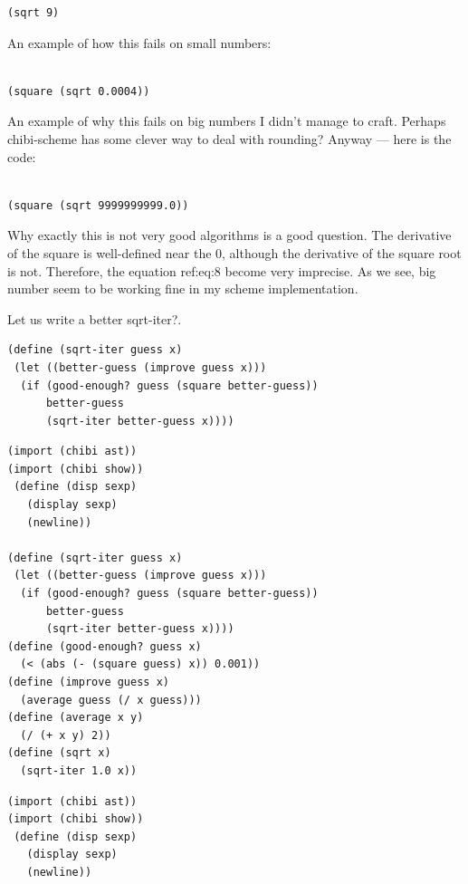 \documentclass[11pt]{article}
\begin{document}
\begin{enumerate}
\begin{enumerate}
\begin{lstlisting}
(sqrt 9)
\end{lstlisting}

An example of how this fails on small numbers:

\lstset{language=Lisp,label= ,caption= ,captionpos=b,numbers=none}
\begin{lstlisting}

(square (sqrt 0.0004))
\end{lstlisting}

An example of why this fails on big numbers I didn't manage to
craft. Perhaps chibi-scheme has some clever way to deal with rounding?
Anyway — here is the code:
\lstset{language=Lisp,label= ,caption= ,captionpos=b,numbers=none}
\begin{lstlisting}

(square (sqrt 9999999999.0))
\end{lstlisting}

Why exactly this is not very good algorithms is a good question. The
derivative of the square is well-defined near the 0, although the
derivative of the square root is not. Therefore, the equation ref:eq:8
become very imprecise. As we see, big number seem to be working fine
in my scheme implementation.

Let us write a better sqrt-iter?.

\lstset{language=Lisp,label= ,caption= ,captionpos=b,numbers=none}
\begin{lstlisting}
(define (sqrt-iter guess x)
 (let ((better-guess (improve guess x)))
  (if (good-enough? guess (square better-guess))
      better-guess
      (sqrt-iter better-guess x))))
\end{lstlisting}

\lstset{language=Lisp,label= ,caption= ,captionpos=b,numbers=none}
\begin{lstlisting}
(import (chibi ast))
(import (chibi show))
 (define (disp sexp)
   (display sexp)
   (newline))

(define (sqrt-iter guess x)
 (let ((better-guess (improve guess x)))
  (if (good-enough? guess (square better-guess))
      better-guess
      (sqrt-iter better-guess x))))
(define (good-enough? guess x)
  (< (abs (- (square guess) x)) 0.001))
(define (improve guess x)
  (average guess (/ x guess)))
(define (average x y)
  (/ (+ x y) 2))
(define (sqrt x)
  (sqrt-iter 1.0 x))

\end{lstlisting}

\lstset{language=Lisp,label= ,caption= ,captionpos=b,numbers=none}
\begin{lstlisting}
(import (chibi ast))
(import (chibi show))
 (define (disp sexp)
   (display sexp)
   (newline))


\end{lstlisting}
\end{enumerate}
\end{enumerate}
\end{document}
